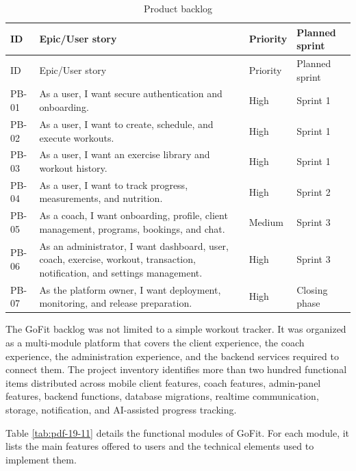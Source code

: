 \documentclass[12pt,a4paper,openany]{report}
\begin{document}
\begingroup
\scriptsize
\setlength{\tabcolsep}{3pt}
\renewcommand{\arraystretch}{1.20}
\setlength{\LTpre}{5pt}
\setlength{\LTpost}{10pt}
\begin{longtable}{|L{2.74cm}|L{5.18cm}|L{4.18cm}|L{2.30cm}|}
\caption{Product backlog}\label{tab:pdf-19-10} \\
\hline
{}
ID & Epic/User story & Priority & Planned sprint \\ \hline
\endfirsthead
\hline
{}
ID & Epic/User story & Priority & Planned sprint \\ \hline
\endhead
PB-01 & As a user, I want secure authentication and onboarding. & High & Sprint 1 \\ \hline
PB-02 & As a user, I want to create, schedule, and execute workouts. & High & Sprint 1 \\ \hline
PB-03 & As a user, I want an exercise library and workout history. & High & Sprint 1 \\ \hline
PB-04 & As a user, I want to track progress, measurements, and nutrition. & High & Sprint 2 \\ \hline
PB-05 & As a coach, I want onboarding, profile, client management, programs, bookings, and chat. & Medium & Sprint 3 \\ \hline
PB-06 & As an administrator, I want dashboard, user, coach, exercise, workout, transaction, notification, and settings management. & High & Sprint 3 \\ \hline
PB-07 & As the platform owner, I want deployment, monitoring, and release preparation. & High & Closing phase \\ \hline
\end{longtable}
\endgroup

The GoFit backlog was not limited to a simple workout tracker. It was organized as a multi-module platform that covers the client experience, the coach experience, the administration experience, and the backend services required to connect them. The project inventory identifies more than two hundred functional items distributed across mobile client features, coach features, admin-panel features, backend functions, database migrations, realtime communication, storage, notification, and AI-assisted progress tracking.


Table \ref{tab:pdf-19-11} details the functional modules of GoFit. For each module, it lists the main features offered to users and the technical elements used to implement them.
\end{document}
